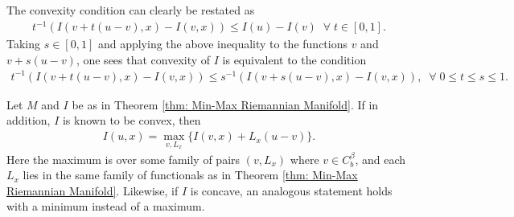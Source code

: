 \documentclass[11pt,reqno]{amsart}
\numberwithin{equation}{section}
\theoremstyle{plain}
\begin{document}
The convexity condition can clearly be restated as
\begin{align*}
  t^{-1}\left ( I(v+t(u-v),x)-I(v,x) \right ) \leq I(u)-I(v)  \;\;\forall\;t\in[0,1].
\end{align*}
Taking $s\in [0,1]$ and applying the above inequality to the functions $v$ and $v+s(u-v)$, one sees that convexity of $I$ is equivalent to the condition
\begin{align*}
  t^{-1}\left ( I(v+t(u-v),x)-I(v,x) \right ) \leq s^{-1}\left ( I(v+s(u-v),x)-I(v,x) \right ),\;\;\forall\; 0\leq t\leq s\leq 1. 
\end{align*}


\begin{lem}\label{lem: max formula convex operator} Let $M$ and $I$ be as in Theorem \ref{thm: Min-Max Riemannian Manifold}. If in addition, $I$ is known to be convex, then
  \begin{align*}
    I(u,x) = \max_{v,L_x} \{ I(v,x)+L_x(u-v)\}. 	  
  \end{align*}	  
  Here the maximum is over some family of pairs $(v,L_x)$ where $v\in C^\beta_b$, and each $L_x$ lies in the same family of functionals as in Theorem \ref{thm: Min-Max Riemannian Manifold}. Likewise, if $I$ is concave, an analogous statement holds with a minimum instead of a maximum.
\end{lem}
\end{document}
